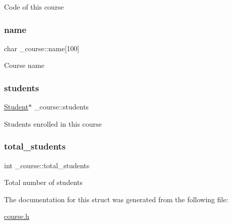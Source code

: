 Code of this course \mbox{\label{struct__course_a8a6f7d2171f18b5d13e86913345f381d}} 
\subsubsection{\texorpdfstring{name}{name}}
{\footnotesize\ttfamily char \+\_\+course\+::name\mbox{[}100\mbox{]}}

Course name \mbox{\label{struct__course_a5cf448bc80f0f8c5f23402db23d41a00}} 
\subsubsection{\texorpdfstring{students}{students}}
{\footnotesize\ttfamily \mbox{\hyperlink{student_8h_abcfb362c0eb3182c835992cf3d0c0dd3}{Student}}$\ast$ \+\_\+course\+::students}

Students enrolled in this course \mbox{\label{struct__course_afd5e161f7cf358c13cc8aa868b462006}} 
\subsubsection{\texorpdfstring{total\+\_\+students}{total\_students}}
{\footnotesize\ttfamily int \+\_\+course\+::total\+\_\+students}

Total number of students 

The documentation for this struct was generated from the following file\+:\begin{DoxyCompactItemize}
\item 
\mbox{\hyperlink{course_8h}{course.\+h}}\end{DoxyCompactItemize}
